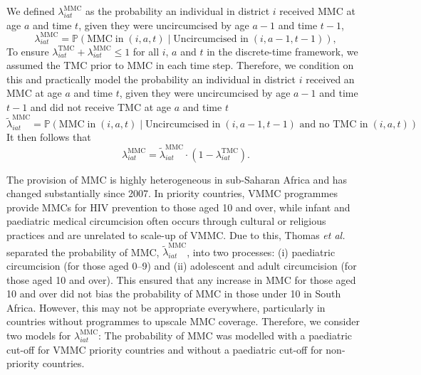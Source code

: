 \documentclass{article}
\begin{document}
\begin{appendix}

\noindent We defined $\lambda^{\text{MMC}}_{iat}$ as the probability an individual in district $i$ received MMC at age $a$ and time $t$, given they were uncircumcised by age $a-1$ and time $t-1$,  
\begin{equation*}
		\lambda^{\text{MMC}}_{iat} = \mathbb{P}(\text{MMC} \; \text{in} \; (i,a,t) \; | \; \text{Uncircumcised in} \; (i,a-1, t-1)),
\end{equation*}
To ensure $\lambda^{\text{TMC}}_{iat} + \lambda^{\text{MMC}}_{iat} \leq 1$ for all $i$, $a$ and $t$ in the discrete-time framework, we assumed the TMC prior to MMC in each time step. Therefore, we condition on this and practically model the probability an individual in district $i$ received an MMC at age $a$ and time $t$, given they were uncircumcised by age $a-1$ and time $t-1$ and did not receive TMC at age $a$ and time $t$
\begin{equation*}
		\tilde{\lambda}^{\text{MMC}}_{iat} = \mathbb{P}(\text{MMC} \; \text{in} \; (i,a,t) \; | \; \text{Uncircumcised in} \; (i,a-1, t-1) \text{ and no TMC in} \; (i,a, t))
\end{equation*}
It then follows that 
\begin{equation*}
		\lambda^{\text{MMC}}_{iat} = \tilde{\lambda}^{\text{MMC}}_{iat}\cdot (1-\lambda^{\text{TMC}}_{iat}).
\end{equation*}

The provision of MMC is highly heterogeneous in sub-Saharan Africa and has changed substantially since 2007. In priority countries, VMMC programmes provide MMCs for HIV prevention to those aged 10 and over, while infant and paediatric medical circumcision often occurs through cultural or religious practices and are unrelated to scale-up of VMMC. Due to this, Thomas {\it et al.} \cite{thomas2024substantial} separated the probability of MMC, $\tilde{\lambda}^{\text{MMC}}_{iat}$, into two processes: (i) paediatric circumcision (for those aged 0--9) and (ii) adolescent and adult circumcision (for those aged 10 and over). This ensured that any increase in MMC for those aged 10 and over did not bias the probability of MMC in those under 10 in South Africa. However, this may not be appropriate everywhere, particularly in countries without programmes to upscale MMC coverage. Therefore, we consider two models for $\lambda^{\text{MMC}}_{iat}$: The probability of MMC was modelled with a paediatric cut-off for VMMC priority countries and without a paediatric cut-off for non-priority countries.


\end{appendix}
\end{document}
